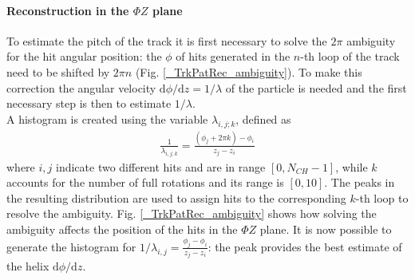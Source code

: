 \documentclass[12pt,a4paper,openright, oneside, titlepage]{book} %
\begin{document}
\paragraph{Reconstruction in the $\Phi Z$ plane} 
To estimate the pitch of the track it is first necessary to solve the $2\pi$ ambiguity for the hit angular position: 
the $\phi$ of hits generated in the $n$-th loop of the track need to be shifted by $2\pi n$
(Fig. \ref{_TrkPatRec_ambiguity}). 
To make this correction the angular velocity $\mathrm{d}\phi/\mathrm{d}z = 1/ \lambda$ of the particle is needed 
and the first necessary  step is then to estimate $1/\lambda$. \\
A histogram is created using the variable $\lambda_{i,j;k}$, defined as
\begin{align}
\frac{1}{\lambda_{i,j;k}} = \frac{(\phi_j+2\pi k)-\phi_i}{z_j-z_i}
\end{align}
where $i,j$ indicate two different hits and are in range $[0,N_{CH}-1]$, 
while $k$ accounts for the number of full rotations and its range is $[0,10]$.
The peaks in the resulting distribution are used to assign hits to the corresponding $k$-th loop to resolve the ambiguity. 
Fig. \ref{_TrkPatRec_ambiguity} shows how solving the ambiguity affects the position of the hits in the $\Phi Z$ plane.
It is now possible to generate the histogram for $1/\lambda_{i,j} = \frac{\phi_j-\phi_i}{z_j-z_i}$: 
the peak provides the best estimate of the helix $\mathrm{d}\phi/\mathrm{d}z$.
\end{document}
